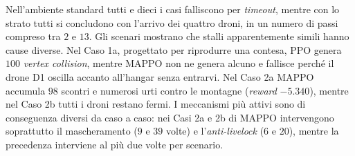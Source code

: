 \documentclass[12pt,a4paper,twoside]{report}
\newcommand{\fonte}[1][elaborazione propria]{\par\vspace{3pt}{\footnotesize\emph{Fonte: #1.}}}
\begin{document}
\begin{table}[htbp]
    \centering
    \caption{Esito degli scenari critici senza e con lo strato di risoluzione (modelli del seme 42, fallimento per \emph{timeout} a 100 passi nel caso standard).}
    \label{tab:8_2}
    \fonte
\end{table}
\newpage
Nell'ambiente standard tutti e dieci i casi falliscono per \emph{timeout}, mentre con lo strato tutti si concludono con l'arrivo dei quattro droni, in un numero di passi compreso tra $2$ e $13$. Gli scenari mostrano che stalli apparentemente simili hanno cause diverse. Nel Caso 1a, progettato per riprodurre una contesa, PPO genera $100$ \emph{vertex collision}, mentre MAPPO non ne genera alcuno e fallisce perché il drone D1 oscilla accanto all'hangar senza entrarvi. Nel Caso 2a MAPPO accumula $98$ scontri e numerosi urti contro le montagne (\emph{reward} $-5.340$), mentre nel Caso 2b tutti i droni restano fermi. I meccanismi più attivi sono di conseguenza diversi da caso a caso: nei Casi 2a e 2b di MAPPO intervengono soprattutto il mascheramento ($9$ e $39$ volte) e l'\emph{anti-livelock} ($6$ e $20$), mentre la precedenza interviene al più due volte per scenario.
\end{document}

